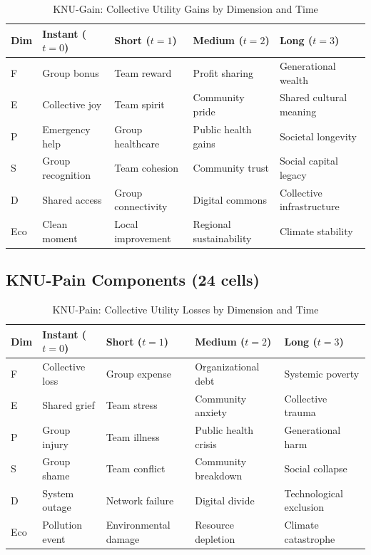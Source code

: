 \begin{table}[htbp]
\centering
\caption{KNU-Gain: Collective Utility Gains by Dimension and Time}
\label{tab:app-c-knu-gain}
\small
\renewcommand{\arraystretch}{1.2}
\begin{tabular}{@{}lp{2.8cm}p{2.8cm}p{2.8cm}p{2.8cm}@{}}
\toprule
\textbf{Dim} & \textbf{Instant ($t=0$)} & \textbf{Short ($t=1$)} & \textbf{Medium ($t=2$)} & \textbf{Long ($t=3$)} \\
\midrule
F & Group bonus & Team reward & Profit sharing & Generational wealth \\
E & Collective joy & Team spirit & Community pride & Shared cultural meaning \\
P & Emergency help & Group healthcare & Public health gains & Societal longevity \\
S & Group recognition & Team cohesion & Community trust & Social capital legacy \\
D & Shared access & Group connectivity & Digital commons & Collective infrastructure \\
Eco & Clean moment & Local improvement & Regional sustainability & Climate stability \\
\bottomrule
\end{tabular}
\end{table}

\subsection{KNU-Pain Components (24 cells)}

\begin{table}[htbp]
\centering
\caption{KNU-Pain: Collective Utility Losses by Dimension and Time}
\label{tab:app-c-knu-pain}
\small
\renewcommand{\arraystretch}{1.2}
\begin{tabular}{@{}lp{2.8cm}p{2.8cm}p{2.8cm}p{2.8cm}@{}}
\toprule
\textbf{Dim} & \textbf{Instant ($t=0$)} & \textbf{Short ($t=1$)} & \textbf{Medium ($t=2$)} & \textbf{Long ($t=3$)} \\
\midrule
F & Collective loss & Group expense & Organizational debt & Systemic poverty \\
E & Shared grief & Team stress & Community anxiety & Collective trauma \\
P & Group injury & Team illness & Public health crisis & Generational harm \\
S & Group shame & Team conflict & Community breakdown & Social collapse \\
D & System outage & Network failure & Digital divide & Technological exclusion \\
Eco & Pollution event & Environmental damage & Resource depletion & Climate catastrophe \\
\bottomrule
\end{tabular}
\end{table}

